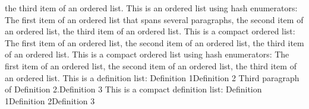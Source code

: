 the third item of an ordered list.\markdownRendererOlItemEnd 
\markdownRendererOlEnd \markdownRendererInterblockSeparator
{}This is an ordered list using hash enumerators:\markdownRendererInterblockSeparator
{}\markdownRendererOlBegin
{}The first item of an ordered list\markdownRendererInterblockSeparator
{}that spans several paragraphs,\markdownRendererOlItemEnd 
{}the second item of an ordered list,\markdownRendererOlItemEnd 
{}the third item of an ordered list.\markdownRendererOlItemEnd 
\markdownRendererOlEnd \markdownRendererInterblockSeparator
{}This is a compact ordered list:\markdownRendererInterblockSeparator
{}\markdownRendererOlBeginTight
{}The first item of an ordered list,\markdownRendererOlItemEnd 
{}the second item of an ordered list,\markdownRendererOlItemEnd 
{}the third item of an ordered list.\markdownRendererOlItemEnd 
\markdownRendererOlEndTight \markdownRendererInterblockSeparator
{}This is a compact ordered list using hash enumerators:\markdownRendererInterblockSeparator
{}\markdownRendererOlBeginTight
{}The first item of an ordered list,\markdownRendererOlItemEnd 
{}the second item of an ordered list,\markdownRendererOlItemEnd 
{}the third item of an ordered list.\markdownRendererOlItemEnd 
\markdownRendererOlEndTight \markdownRendererInterblockSeparator
{}This is a definition list:\markdownRendererInterblockSeparator
{}\markdownRendererDlBegin
{}\markdownRendererDlDefinitionBegin Definition 1\markdownRendererDlDefinitionEnd \markdownRendererDlItemEnd {}\markdownRendererDlDefinitionBegin Definition 2\markdownRendererInterblockSeparator
{}\markdownRendererInterblockSeparator
{}Third paragraph of Definition 2.\markdownRendererDlDefinitionEnd \markdownRendererDlDefinitionBegin Definition 3\markdownRendererDlDefinitionEnd \markdownRendererDlItemEnd 
\markdownRendererDlEnd\markdownRendererInterblockSeparator
{}This is a compact definition list:\markdownRendererInterblockSeparator
{}\markdownRendererDlBeginTight
{}\markdownRendererDlDefinitionBegin Definition 1\markdownRendererDlDefinitionEnd \markdownRendererDlItemEnd {}\markdownRendererDlDefinitionBegin Definition 2\markdownRendererDlDefinitionEnd \markdownRendererDlDefinitionBegin Definition 3\markdownRendererDlDefinitionEnd \markdownRendererDlItemEnd 
